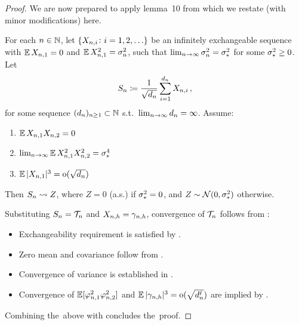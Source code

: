 \begin{proof}
We are now prepared to apply lemma~10 from \citep{matthews2018gaussian} which we restate (with minor modifications) here. 

\begin{lemma}\label{lemma:eCLT}
For each $n \in \mathbb{N}$, let $\{ X_{n, i} \colon i = 1,2, \ldots \}$ be an infinitely exchangeable sequence with $\operatorname*{\mathbb{E}} X_{n, 1} = 0$ and $\operatorname*{\mathbb{E}} X_{n, 1}^2 = \sigma^2_{n}$, such that $\lim_{n \to \infty} \sigma^2_{n} = \sigma^2_{*}$ for some $\sigma^2_{*} \geq 0$.
Let 
\begin{equation}
    S_{n} 
    \coloneqq
    \frac{1}{\sqrt{d_n}}
    \sum_{i=1}^{d_n} 
        X_{n, i} 
    \, , 
\end{equation}
for some sequence $(d_n)_{n \geq 1} \subset \mathbb{N}$ s.t.\ $\lim_{n \to \infty} d_n = \infty$.
Assume:

\begin{enumerate}[\hspace{1em}(a)]
    \item $\operatorname*{\mathbb{E}}{X_{n, 1} X_{n, 2}} = 0 $
    \item $ \lim_{n \to \infty }\operatorname*{\mathbb{E}}{X_{n, 1}^{2} X_{n, 2}^{2}}  = \sigma_{*}^{4} $
    \item $ \operatorname*{\mathbb{E}}{|X_{n, 1}|^{3}} = \mathrm{o}(\sqrt{d_n}) $
\end{enumerate}

Then $S_{n} \rightsquigarrow Z$, where $Z = 0$ (a.s.) if $\sigma^2_{*} = 0$, and $Z \sim \mathcal{N} (0, \sigma^2_{*})$ otherwise.
\end{lemma}

Substituting $S_{n} = \mathcal{T}_{n}$ and $X_{n, h} = \gamma_{n, h}$, convergence of $\mathcal{T}_{n}$ follows from :
\begin{itemize}
    \item Exchangeability requirement is satisfied by .
    \item Zero mean and covariance follow from .
    \item Convergence of variance is established in .
    \item Convergence of $\operatorname*{\mathbb{E}} \lbrack \varphi_{n , 1}^2 \varphi_{n , 2}^2 \rbrack$ and $\operatorname*{\mathbb{E}} |\gamma_{n, h}|^3 = \mathrm{o}(\sqrt{d_{n}^{\ell}})$ are implied by .
\end{itemize}
Combining the~above with  concludes the~proof.
\end{proof}

